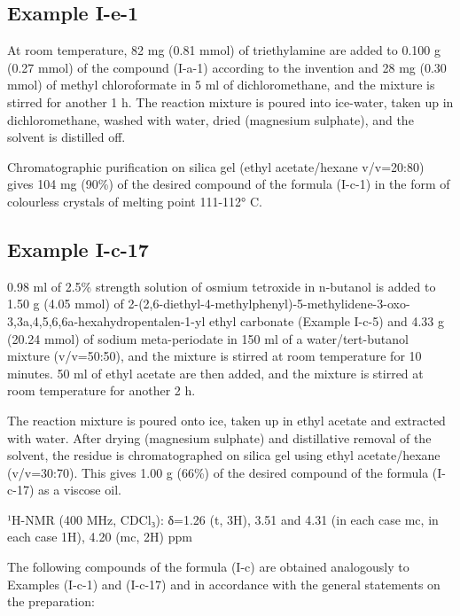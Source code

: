 \documentclass[11pt,a4paper]{article}
\begin{document}
\subsection{Example I-e-1}

At room temperature, 82 mg (0.81 mmol) of triethylamine are added to 0.100 g (0.27 mmol) of the compound (I-a-1) according to the invention and 28 mg (0.30 mmol) of methyl chloroformate in 5 ml of dichloromethane, and the mixture is stirred for another 1 h. The reaction mixture is poured into ice-water, taken up in dichloromethane, washed with water, dried (magnesium sulphate), and the solvent is distilled off.

Chromatographic purification on silica gel (ethyl acetate/hexane v/v=20:80) gives 104 mg (90\%) of the desired compound of the formula (I-c-1) in the form of colourless crystals of melting point 111-112° C.

\subsection{Example I-c-17}

0.98 ml of 2.5\% strength solution of osmium tetroxide in n-butanol is added to 1.50 g (4.05 mmol) of 2-(2,6-diethyl-4-methylphenyl)-5-methylidene-3-oxo-3,3a,4,5,6,6a-hexahydropentalen-1-yl ethyl carbonate (Example I-c-5) and 4.33 g (20.24 mmol) of sodium meta-periodate in 150 ml of a water/tert-butanol mixture (v/v=50:50), and the mixture is stirred at room temperature for 10 minutes. 50 ml of ethyl acetate are then added, and the mixture is stirred at room temperature for another 2 h.

The reaction mixture is poured onto ice, taken up in ethyl acetate and extracted with water. After drying (magnesium sulphate) and distillative removal of the solvent, the residue is chromatographed on silica gel using ethyl acetate/hexane (v/v=30:70). This gives 1.00 g (66\%) of the desired compound of the formula (I-c-17) as a viscose oil.

¹H-NMR (400 MHz, CDCl₃): δ=1.26 (t, 3H), 3.51 and 4.31 (in each case mc, in each case 1H), 4.20 (mc, 2H) ppm

The following compounds of the formula (I-c) are obtained analogously to Examples (I-c-1) and (I-c-17) and in accordance with the general statements on the preparation:
\end{document}
